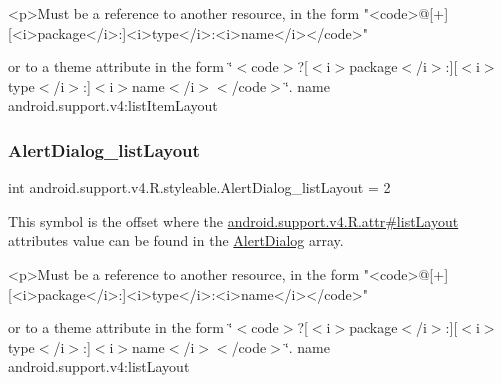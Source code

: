 \begin{DoxyVerb}      <p>Must be a reference to another resource, in the form "<code>@[+][<i>package</i>:]<i>type</i>:<i>name</i></code>"
\end{DoxyVerb}
 or to a theme attribute in the form \char`\"{}$<$code$>$?\mbox{[}$<$i$>$package$<$/i$>$\+:\mbox{]}\mbox{[}$<$i$>$type$<$/i$>$\+:\mbox{]}$<$i$>$name$<$/i$>$$<$/code$>$\char`\"{}.  name android.\+support.\+v4\+:list\+Item\+Layout \mbox{\label{classandroid_1_1support_1_1v4_1_1R_1_1styleable_a2d34538b1db2a88b217f6cd6dc60a8ff}} 
\subsubsection{\texorpdfstring{Alert\+Dialog\+\_\+list\+Layout}{AlertDialog\_listLayout}}
{\footnotesize\ttfamily int android.\+support.\+v4.\+R.\+styleable.\+Alert\+Dialog\+\_\+list\+Layout = 2\hspace{0.3cm}{\ttfamily [static]}}

This symbol is the offset where the \hyperlink{classandroid_1_1support_1_1v4_1_1R_1_1attr_aaa4f60da265ec9c98e41d06c2da774fc}{android.\+support.\+v4.\+R.\+attr\#list\+Layout} attribute\textquotesingle{}s value can be found in the \hyperlink{classandroid_1_1support_1_1v4_1_1R_1_1styleable_a5116e3c5b33ab9db032c1574d2588f5e}{Alert\+Dialog} array.

\begin{DoxyVerb}      <p>Must be a reference to another resource, in the form "<code>@[+][<i>package</i>:]<i>type</i>:<i>name</i></code>"
\end{DoxyVerb}
 or to a theme attribute in the form \char`\"{}$<$code$>$?\mbox{[}$<$i$>$package$<$/i$>$\+:\mbox{]}\mbox{[}$<$i$>$type$<$/i$>$\+:\mbox{]}$<$i$>$name$<$/i$>$$<$/code$>$\char`\"{}.  name android.\+support.\+v4\+:list\+Layout \mbox{\label{classandroid_1_1support_1_1v4_1_1R_1_1styleable_a543519cd3d3b938c48d9d1c6133eba4b}} 

